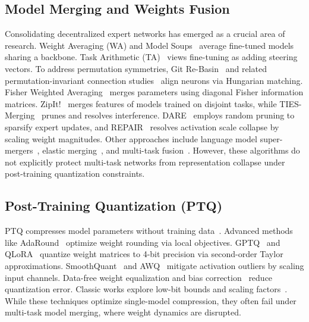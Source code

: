 \documentclass{article}
\theoremstyle{plain}
\theoremstyle{definition}
\theoremstyle{remark}
\begin{document}
\subsection{Model Merging and Weights Fusion}
Consolidating decentralized expert networks has emerged as a crucial area of research. Weight Averaging (WA) and Model Soups~\cite{wortsman2022model} average fine-tuned models sharing a backbone. Task Arithmetic (TA)~\cite{ilharco2022editing} views fine-tuning as adding steering vectors. To address permutation symmetries, Git Re-Basin~\cite{ainsworth2022git} and related permutation-invariant connection studies~\cite{frankle2020linear, entezari2021role} align neurons via Hungarian matching. Fisher Weighted Averaging~\cite{matena2022merging} merges parameters using diagonal Fisher information matrices. ZipIt!~\cite{stoica2023zipit} merges features of models trained on disjoint tasks, while TIES-Merging~\cite{yadav2023resolving} prunes and resolves interference. DARE~\cite{jin2023dare} employs random pruning to sparsify expert updates, and REPAIR~\cite{jordan2023repair} resolves activation scale collapse by scaling weight magnitudes. Other approaches include language model super-mergers~\cite{yu2023language}, elastic merging~\cite{daheim2023elastic}, and multi-task fusion~\cite{choshen2022fusing, ortiz2023task, donyehiya2022cold, gupta2020model, yang2020fusing}. However, these algorithms do not explicitly protect multi-task networks from representation collapse under post-training quantization constraints.

\subsection{Post-Training Quantization (PTQ)}
PTQ compresses model parameters without training data~\cite{gholami2021survey}. Advanced methods like AdaRound~\cite{nagel2020up} optimize weight rounding via local objectives. GPTQ~\cite{frantar2022gptq} and QLoRA~\cite{dettmers2023qlora} quantize weight matrices to 4-bit precision via second-order Taylor approximations. SmoothQuant~\cite{xiao2023smoothquant} and AWQ~\cite{lin2023awq} mitigate activation outliers by scaling input channels. Data-free weight equalization and bias correction~\cite{nagel2019data} reduce quantization error. Classic works explore low-bit bounds and scaling factors~\cite{banner2019post, zhao2019improving, hubara2016quantized, jacob2018quantization, krishnamoorthi2018quantizing, esser2019learned, choi2018pact, bhalgat2020lsq}. While these techniques optimize single-model compression, they often fail under multi-task model merging, where weight dynamics are disrupted.
\end{document}
